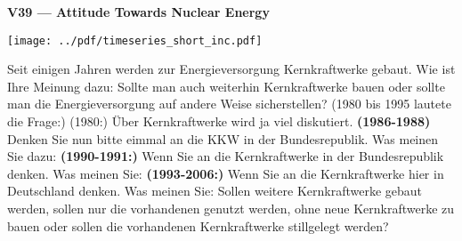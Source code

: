 \documentclass{article}
\begin{document}
\pagestyle{empty}
\fontsize{24pt}{18pt}\selectfont
\hspace*{2.0cm}
\textbf{V39 — Attitude Towards Nuclear Energy} 
\begin{center}
\fontsize{12pt}{14pt}\selectfont
\vspace*{0.15cm}
\texttt{[image: ../pdf/timeseries\_short\_inc.pdf]}
\vspace*{0.25cm}
\begin{minipage}[t]{26.5cm}
\begin{multicols}{2} 
Seit einigen Jahren werden zur Energieversorgung Kernkraftwerke gebaut. Wie ist Ihre Meinung dazu: Sollte man auch weiterhin Kernkraftwerke bauen oder sollte man die Energieversorgung auf andere Weise sicherstellen?
(1980 bis 1995 lautete die Frage:) (1980:) Über Kernkraftwerke wird ja viel diskutiert. \textbf{(1986-1988)} 
Denken Sie nun bitte eimmal an die KKW in der Bundesrepublik. Was meinen Sie dazu: \textbf{(1990-1991:)} Wenn Sie an die Kernkraftwerke in der Bundesrepublik denken. Was meinen Sie: \textbf{(1993-2006:)} Wenn Sie an die Kernkraftwerke hier in Deutschland denken. Was meinen Sie: Sollen weitere Kernkraftwerke gebaut werden, sollen nur die vorhandenen genutzt werden, ohne neue Kernkraftwerke zu bauen oder sollen die vorhandenen Kernkraftwerke stillgelegt werden?
\end{multicols}
\end{minipage}
\end{center}
\end{document}
